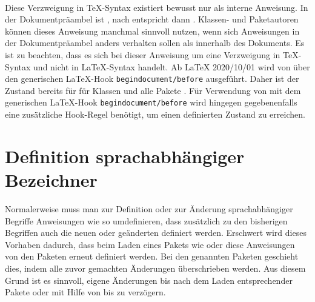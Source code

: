 \begin{Declaration}[0]
  \ \ %
  \  
\end{Declaration}
Diese Verzweigung in \TeX-Syntax existiert bewusst nur als interne
Anweisung. In der Dokumentpräambel ist  ,
nach  entspricht  dann
.  Klassen- und Paketautoren können dieses Anweisung manchmal
sinnvoll nutzen, wenn sich Anweisungen in der Dokumentpräambel anders
verhalten sollen als innerhalb des Dokuments. Es ist zu
beachten, dass es sich bei dieser Anweisung um eine Verzweigung in \TeX-Syntax
und nicht in \LaTeX-Syntax handelt. Ab
\LaTeX{} 2020/10/01 wird  von  über
den generischen \LaTeX-Hook \texttt{begindocument/before} ausgeführt. Daher
ist der Zustand bereits für  für Klassen und alle Pakete
. Für Verwendung von  mit dem generischen
\LaTeX-Hook \texttt{begindocument/before} wird hingegen gegebenenfalls eine
zusätzliche Hook-Regel benötigt, um einen definierten Zustand zu erreichen.%
\EndIndexGroup


\section{Definition sprachabhängiger Bezeichner}
\BeginIndexGroup
{}

\iffalse%
Anfänger haben häufig Probleme damit, sprachabhängige Begriffe wie
\Macro{listfigurename}\IndexCmd{listfigurename}, in der Voreinstellung meist
»List of Figures« beziehungsweise in Deutsch: »Abbildungsverzeichnis«, zu
ändern. Werden diese beispielsweise einfach mit \Macro{renewcommand} in der
Dokumentpräambel umdefiniert, so überleben sie eine spätere Umschaltung der
Sprache nicht. Bei Verwendung von \Package{babel}\IndexCmd{babel} wird die
Umdefinierung in der Dokumentpräambel bereits von
\Macro{begin}\PParameter{document} wieder überschrieben.
\fi

Normalerweise muss man zur Definition oder zur Änderung sprachabhängiger
Begriffe Anweisungen wie  so umdefinieren, dass
zusätzlich zu den bisherigen Begriffen auch die neuen oder geänderten
definiert werden. Erschwert wird dieses Vorhaben dadurch, dass beim Laden
eines Pakets wie  oder
 diese Anweisungen von den
Paketen erneut definiert werden. Bei den genannten Paketen geschieht dies,
indem alle zuvor gemachten Änderungen überschrieben werden. Aus diesem Grund
ist es sinnvoll, eigene Änderungen bis nach dem Laden entsprechender Pakete
oder mit Hilfe von  bis
 zu verzögern.

